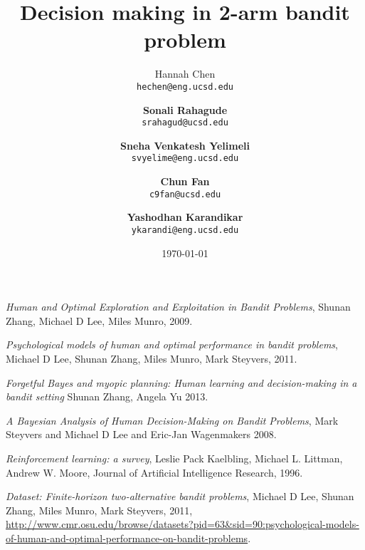 \documentclass{article} %
\title{Decision making in 2-arm bandit problem}
\author{Hannah Chen \\
  \texttt{hechen@eng.ucsd.edu} \and \textbf{Sonali Rahagude}\\
  \texttt{srahagud@ucsd.edu} \and \textbf{Sneha Venkatesh Yelimeli}\\
  \texttt{svyelime@eng.ucsd.edu} \and \textbf{Chun Fan}\\
  \texttt{c9fan@ucsd.edu} \and \textbf{Yashodhan Karandikar}\\
  \texttt{ykarandi@eng.ucsd.edu}}
\date{\today}
\begin{document}
\maketitle





%

\begin{thebibliography}{9}

	\emph{Human and Optimal Exploration and Exploitation in Bandit Problems},
	Shunan Zhang, Michael D Lee, Miles Munro,
	2009.

  \emph{Psychological models of human and optimal performance in bandit problems},
  Michael D Lee, Shunan Zhang, Miles Munro, Mark Steyvers,
  2011.

 \emph{Forgetful Bayes and myopic planning: Human learning and decision-making in a bandit setting}
  Shunan Zhang, Angela Yu
  2013.

  \emph{A Bayesian Analysis of Human Decision-Making on Bandit Problems},
  Mark Steyvers and Michael D Lee and Eric-Jan Wagenmakers
  2008.
  
	\emph{Reinforcement learning: a survey},
	Leslie Pack	Kaelbling, Michael L. Littman, Andrew W. Moore,
	Journal of Artificial Intelligence Research,
	1996.

  \emph{Dataset: Finite-horizon two-alternative bandit problems},
  Michael D Lee, Shunan Zhang, Miles Munro, Mark Steyvers,
  2011,
  \url{http://www.cmr.osu.edu/browse/datasets?pid=63&sid=90:psychological-models-of-human-and-optimal-performance-on-bandit-problems}.

%
\end{thebibliography}
\end{document}
